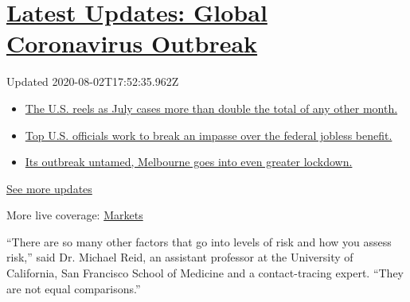 \hypertarget{latest-updates-global-coronavirus-outbreak}{%
\section{\texorpdfstring{\href{https://www.nytimes3xbfgragh.onion/2020/08/01/world/coronavirus-covid-19.html?action=click\&pgtype=Article\&state=default\&region=MAIN_CONTENT_1\&context=storylines_live_updates}{Latest
Updates: Global Coronavirus
Outbreak}}{Latest Updates: Global Coronavirus Outbreak}}\label{latest-updates-global-coronavirus-outbreak}}

Updated 2020-08-02T17:52:35.962Z

\begin{itemize}
\tightlist
\item
  \href{https://www.nytimes3xbfgragh.onion/2020/08/01/world/coronavirus-covid-19.html?action=click\&pgtype=Article\&state=default\&region=MAIN_CONTENT_1\&context=storylines_live_updates\#link-34047410}{The
  U.S. reels as July cases more than double the total of any other
  month.}
\item
  \href{https://www.nytimes3xbfgragh.onion/2020/08/01/world/coronavirus-covid-19.html?action=click\&pgtype=Article\&state=default\&region=MAIN_CONTENT_1\&context=storylines_live_updates\#link-780ec966}{Top
  U.S. officials work to break an impasse over the federal jobless
  benefit.}
\item
  \href{https://www.nytimes3xbfgragh.onion/2020/08/01/world/coronavirus-covid-19.html?action=click\&pgtype=Article\&state=default\&region=MAIN_CONTENT_1\&context=storylines_live_updates\#link-2bc8948}{Its
  outbreak untamed, Melbourne goes into even greater lockdown.}
\end{itemize}

\href{https://www.nytimes3xbfgragh.onion/2020/08/01/world/coronavirus-covid-19.html?action=click\&pgtype=Article\&state=default\&region=MAIN_CONTENT_1\&context=storylines_live_updates}{See
more updates}

More live coverage:
\href{https://www.nytimes3xbfgragh.onion/live/2020/07/31/business/stock-market-today-coronavirus?action=click\&pgtype=Article\&state=default\&region=MAIN_CONTENT_1\&context=storylines_live_updates}{Markets}

``There are so many other factors that go into levels of risk and how
you assess risk,'' said Dr. Michael Reid, an assistant professor at the
University of California, San Francisco School of Medicine and a
contact-tracing expert. ``They are not equal comparisons.''

